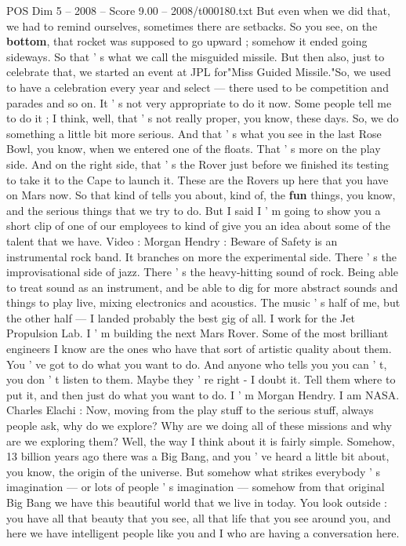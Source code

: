 \begin{textsample}{POS Dim 5 – 2008 – Score 9.00 – 2008/t000180.txt}
But even when we did that, we had to remind ourselves, sometimes there are setbacks.
So you see, on the \textbf{bottom}, that rocket was supposed to go upward ; somehow it ended going sideways.
So that ' s what we call the misguided missile.
But then also, just to celebrate that, we started an event at JPL for"Miss Guided Missile."So, we used to have a celebration every year and select — there used to be competition and parades and so on.
It ' s not very appropriate to do it now.
Some people tell me to do it ; I think, well, that ' s not really proper, you know, these days.
So, we do something a little bit more serious.
And that ' s what you see in the last Rose Bowl, you know, when we entered one of the floats.
That ' s more on the play side.
And on the right side, that ' s the Rover just before we finished its testing to take it to the Cape to launch it.
These are the Rovers up here that you have on Mars now.
So that kind of tells you about, kind of, the \textbf{fun} things, you know, and the serious things that we try to do.
But I said I ' m going to show you a short clip of one of our employees to kind of give you an idea about some of the talent that we have.
Video : Morgan Hendry : Beware of Safety is an instrumental rock band.
It branches on more the experimental side.
There ' s the improvisational side of jazz.
There ' s the heavy-hitting sound of rock.
Being able to treat sound as an instrument, and be able to dig for more abstract sounds and things to play live, mixing electronics and acoustics.
The music ' s half of me, but the other half — I landed probably the best gig of all.
I work for the Jet Propulsion Lab.
I ' m building the next Mars Rover.
Some of the most brilliant engineers I know are the ones who have that sort of artistic quality about them.
You ' ve got to do what you want to do.
And anyone who tells you you can ' t, you don ' t listen to them.
Maybe they ' re right - I doubt it.
Tell them where to put it, and then just do what you want to do.
I ' m Morgan Hendry.
I am NASA.
Charles Elachi : Now, moving from the play stuff to the serious stuff, always people ask, why do we explore?
Why are we doing all of these missions and why are we exploring them?
Well, the way I think about it is fairly simple.
Somehow, 13 billion years ago there was a Big Bang, and you ' ve heard a little bit about, you know, the origin of the universe.
But somehow what strikes everybody ' s imagination — or lots of people ' s imagination — somehow from that original Big Bang we have this beautiful world that we live in today.
You look outside : you have all that beauty that you see, all that life that you see around you, and here we have intelligent people like you and I who are having a conversation here.

\end{textsample}
